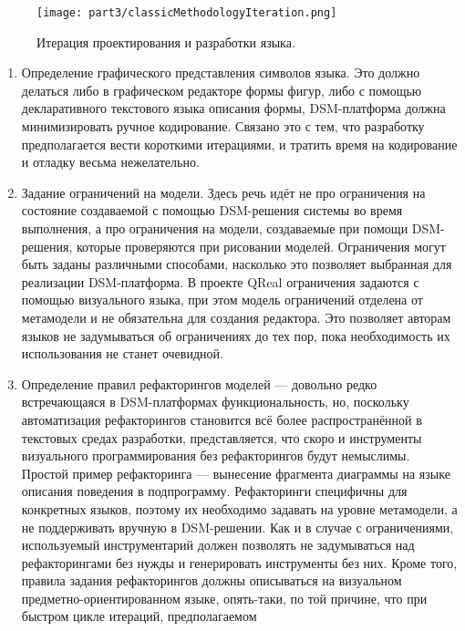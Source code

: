 \begin{figure} [ht]
	\begin{center}
		\texttt{[image: part3/classicMethodologyIteration.png]}
		\caption{Итерация проектирования и разработки языка.}
		\label{classicMethodologyIteration}
	\end{center}
\end{figure}

\begin{enumerate}
	\item Определение графического представления символов языка. Это должно делаться 
		либо в графическом редакторе формы фигур, либо с помощью декларативного текстового
		языка описания формы, DSM-платформа должна минимизировать ручное кодирование. 
		Связано это с тем, что разработку предполагается вести короткими итерациями, и 
		тратить время на кодирование и отладку весьма нежелательно.
	\item Задание ограничений на модели. Здесь речь идёт не про ограничения на состояние 
		создаваемой с помощью DSM-решения системы во время выполнения, а про ограничения 
		на модели, создаваемые при помощи DSM-решения, которые проверяются при рисовании 
		моделей. Ограничения могут быть заданы различными способами, насколько это позволяет
		выбранная для реализации DSM-платформа. В проекте QReal ограничения задаются с помощью 
		визуального языка, при этом модель ограничений отделена от метамодели и не обязательна 
		для создания редактора. Это позволяет авторам языков не задумываться об ограничениях 
		до тех пор, пока необходимость их использования не станет очевидной.
	\item Определение правил рефакторингов моделей --- довольно редко встречающаяся в 
		DSM-платформах функциональность, но, поскольку автоматизация рефакторингов становится 
		всё более распространённой в текстовых средах разработки, представляется, что 
		скоро и инструменты визуального программирования без рефакторингов будут немыслимы. 
		Простой пример рефакторинга --- вынесение фрагмента диаграммы на языке описания 
		поведения в подпрограмму. Рефакторинги специфичны для конкретных языков, поэтому 
		их необходимо задавать на уровне метамодели, а не поддерживать вручную в DSM-решении. 
		Как и в случае с ограничениями, используемый инструментарий должен позволять не 
		задумываться над рефакторингами без нужды и генерировать инструменты без них. Кроме 
		того, правила задания рефакторингов должны описываться на визуальном предметно-ориентированном 
		языке, опять-таки, по той причине, что при быстром цикле итераций, предполагаемом 

\end{enumerate}
